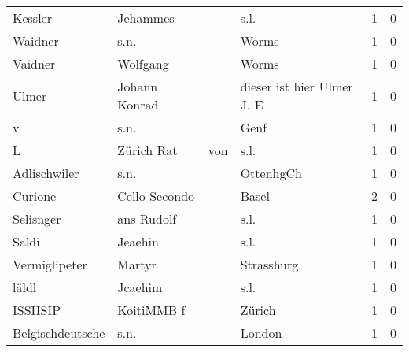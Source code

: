 \begin{center}
\begin{tiny}
\begin{longtabu}{llllrr}
                  Kessler &                           Jehammes &             &                                        s.l. &          1 &         0 \\
                  Waidner &                               s.n. &             &                                       Worms &          1 &         0 \\
                  Vaidner &                           Wolfgang &             &                                       Worms &          1 &         0 \\
                    Ulmer &                      Johann Konrad &             &                  dieser ist hier Ulmer J. E &          1 &         0 \\
                        v &                               s.n. &             &                                        Genf &          1 &         0 \\
                        L &                         Zürich Rat &         von &                                        s.l. &          1 &         0 \\
             Adlischwiler &                               s.n. &             &                                   OttenhgCh &          1 &         0 \\
                  Curione &                      Cello Secondo &             &                                       Basel &          2 &         0 \\
                Selisnger &                         ans Rudolf &             &                                        s.l. &          1 &         0 \\
                    Saldi &                            Jeaehin &             &                                        s.l. &          1 &         0 \\
            Vermiglipeter &                             Martyr &             &                                  Strasshurg &          1 &         0 \\
                    läldl &                            Jcaehim &             &                                        s.l. &          1 &         0 \\
                 ISSIISIP &                         KoitiMMB f &             &                                      Zürich &          1 &         0 \\
         Belgischdeutsche &                               s.n. &             &                                      London &          1 &         0 \\

\end{longtabu}
\end{tiny}
\end{center}
